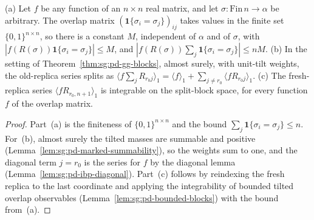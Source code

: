 \begin{lemma}\label{lem:sg:pd-overlap-split}
  \leanok
(a) Let $f$ be any function of an $n\times n$ real matrix, and let $\sigma:\mathrm{Fin}\,n\to\alpha$ be arbitrary. The overlap matrix $(\mathbf 1\{\sigma_i=\sigma_j\})_{ij}$ takes values in the finite set $\{0,1\}^{n\times n}$, so there is a constant $M$, independent of $\alpha$ and of $\sigma$, with $|f(R(\sigma))\mathbf 1\{\sigma_i=\sigma_j\}|\le M$, and $|f(R(\sigma))\sum_j\mathbf 1\{\sigma_i=\sigma_j\}|\le nM$.
(b) In the setting of Theorem~\ref{thm:sg:pd-gg-blocks}, almost surely, with unit-tilt weights, the old-replica series splits as $\langle f\sum_jR_{r_0j}\rangle_1=\langle f\rangle_1+\sum_{j\ne r_0}\langle fR_{r_0j}\rangle_1$.
(c) The fresh-replica series $\langle fR_{r_0,n+1}\rangle_1$ is integrable on the split-block space, for every function $f$ of the overlap matrix.
\end{lemma}
\begin{proof}
  \leanok
Part~(a) is the finiteness of $\{0,1\}^{n\times n}$ and the bound $\sum_j\mathbf 1\{\sigma_i=\sigma_j\}\le n$. For~(b), almost surely the tilted masses are summable and positive (Lemma~\ref{lem:sg:pd-marked-summability}), so the weights sum to one, and the diagonal term $j=r_0$ is the series for $f$ by the diagonal lemma (Lemma~\ref{lem:sg:pd-ibp-diagonal}). Part~(c) follows by reindexing the fresh replica to the last coordinate and applying the integrability of bounded tilted overlap observables (Lemma~\ref{lem:sg:pd-bounded-blocks}) with the bound from~(a).
\end{proof}

